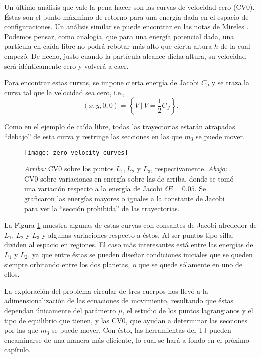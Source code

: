 Un último análisis que vale la pena hacer son las curvas de velocidad cero (CV0). Éstas son el punto máxmimo de retorno para una energía dada en el espacio de configuraciones. Un análisis similar se puede encontrar en las notas de Mireles \cite{MirelesJames2006}. Podemos pensar, como analogía, que para una energía potencial dada, una partícula en caída libre no podrá rebotar más alto que cierta altura $h$ de la cual empezó. De hecho, justo cuando la partícula alcance dicha altura, su velocidad será idénticamente cero y volverá a caer. 

Para encontrar estas curvas, se impone cierta energía de Jacobi $C_J$ y se traza la curva tal que la velocidad sea cero, i.e.,
\begin{equation*}
 (x,y,0,0) = \left\lbrace V \ | \  V = \frac{1}{2}C_J \right\rbrace.
\end{equation*}

Como en el ejemplo de caída libre, todas las trayectorias estarán atrapadas ``debajo'' de esta curva y restringe las secciones en las que $m_3$ se puede mover. 

\begin{figure}[h!]
 \centering
 \texttt{[image: zero\_velocity\_curves]}
 \caption{\textit{Arriba:} CV0 sobre los puntos $L_1, L_2$ y $L_3$, respectivamente. \textit{Abajo:} CV0 sobre variaciones en energía sobre las de arriba, donde se tomó una variación respecto a la energía de Jacobi $\delta E = 0.05$. Se graficaron las energías mayores o iguales a la constante de Jacobi para ver la ``sección prohibida'' de las trayectorias. }
 \label{fig:zero_velocity_curves}
\end{figure}

La Figura \ref{fig:zero_velocity_curves} muestra algunas de estas curvas con consantes de Jacobi alrededor de $L_1$, $L_2$ y $L_3$ y algunas variaciones respecto a éstos. Al ser puntos tipo silla, dividen al espacio en regiones. El caso más interesantes está entre las energías de $L_1$ y $L_2$, ya que entre éstas se pueden diseñar condiciones iniciales que se queden siempre orbitando entre los dos planetas, o que se quede sólamente en uno de ellos.

La exploración del problema circular de tres cuerpos nos llevó a la adimensionalización de las ecuaciones de movimiento, resultando que éstas dependan únicamente del parámetro $\mu$, el estudio de los puntos lagrangianos y el tipo de equilibrio que tienen, y las CV0, que ayudan a determinar las secciones por las que $m_3$ se puede mover. Con ésto, las herramientas del TJ pueden encaminarse de una manera más eficiente, lo cual se hará a fondo en el próximo capítulo.